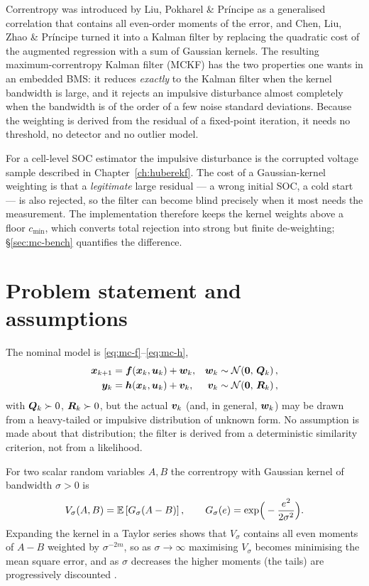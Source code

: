Correntropy was introduced by Liu, Pokharel \& Pr{\'i}ncipe \cite{liu2007correntropy} as a
generalised correlation that contains all even-order moments of the error, and Chen, Liu, Zhao \&
Pr{\'i}ncipe \cite{chen2017mckf} turned it into a Kalman filter by replacing the quadratic cost of
the augmented regression with a sum of Gaussian kernels.  The resulting maximum-correntropy Kalman
filter (MCKF) has the two properties one wants in an embedded BMS: it reduces \emph{exactly} to the
Kalman filter when the kernel bandwidth is large, and it rejects an impulsive disturbance almost
completely when the bandwidth is of the order of a few noise standard deviations.  Because the
weighting is derived from the residual of a fixed-point iteration, it needs no threshold, no
detector and no outlier model.

For a cell-level SOC estimator the impulsive disturbance is the corrupted voltage sample described
in Chapter~\ref{ch:huberekf}.  The cost of a Gaussian-kernel weighting is that a \emph{legitimate}
large residual --- a wrong initial SOC, a cold start --- is also rejected, so the filter can become
blind precisely when it most needs the measurement.  The implementation therefore keeps the kernel
weights above a floor $c_{\min}$, which converts total rejection into strong but finite
de-weighting; \S\ref{sec:mc-bench} quantifies the difference.

\section{Problem statement and assumptions}
The nominal model is \eqref{eq:mc-f}--\eqref{eq:mc-h},
\begin{align}
\bm{x}_{k+1} &= \bm{f}(\bm{x}_k,\bm{u}_k)+\bm{w}_k, & \bm{w}_k&\sim\mathcal{N}\!\left(\bm 0,\,\bm{Q}_k\right), \label{eq:mc-f}\\
\bm{y}_k &= \bm{h}(\bm{x}_k,\bm{u}_k)+\bm{v}_k, & \bm{v}_k&\sim\mathcal{N}\!\left(\bm 0,\,\bm{R}_k\right), \label{eq:mc-h}
\end{align}
with $\bm{Q}_k\succ0$, $\bm{R}_k\succ0$, but the actual $\bm{v}_k$ (and, in general, $\bm{w}_k$) may be
drawn from a heavy-tailed or impulsive distribution of unknown form.  No assumption is made about
that distribution; the filter is derived from a deterministic similarity criterion, not from a
likelihood.

\begin{definition}[Correntropy]\label{def:mc-corr}
For two scalar random variables $A,B$ the correntropy with Gaussian kernel of bandwidth
$\sigma>0$ is
\begin{equation}
V_\sigma(A,B) = \mathbb{E}\left[G_\sigma(A-B)\right],\qquad
G_\sigma(e) = \exp\!\Big(-\frac{e^2}{2\sigma^2}\Big).
\label{eq:mc-V}
\end{equation}
Expanding the kernel in a Taylor series shows that $V_\sigma$ contains all even moments of $A-B$
weighted by $\sigma^{-2m}$, so as $\sigma\to\infty$ maximising $V_\sigma$ becomes minimising the
mean square error, and as $\sigma$ decreases the higher moments (the tails) are progressively
discounted \cite{liu2007correntropy}.
\end{definition}

